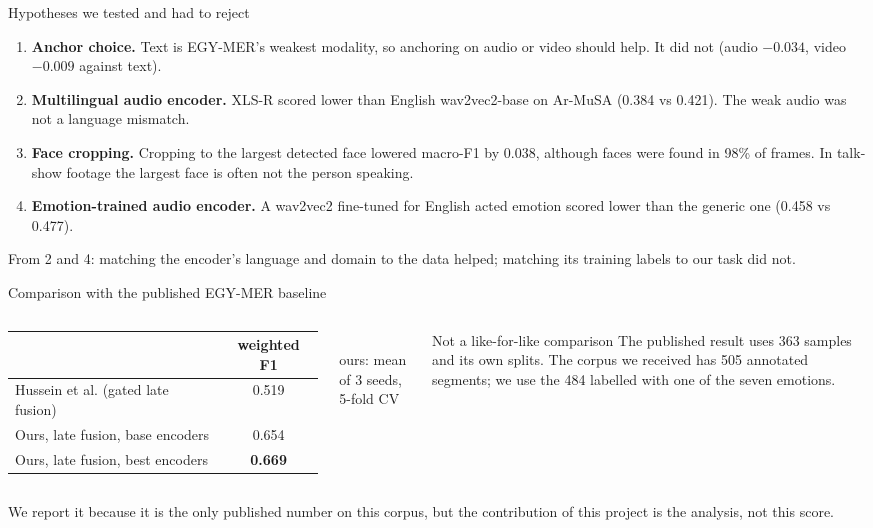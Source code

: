 \documentclass[aspectratio=169,10pt]{beamer}
\newcommand{\muted}[1]{\textcolor{MutedGray}{#1}}
\begin{document}
\begin{frame}[t]{Hypotheses we tested and had to reject}
\begin{enumerate}
\item \textbf{Anchor choice.} Text is EGY-MER's weakest modality, so anchoring on
      audio or video should help. It did not (audio $-0.034$, video $-0.009$ against text).
\item \textbf{Multilingual audio encoder.} XLS-R scored lower than English
      wav2vec2-base on Ar-MuSA (0.384 vs 0.421). The weak audio was not a language mismatch.
\item \textbf{Face cropping.} Cropping to the largest detected face lowered
      macro-F1 by 0.038, although faces were found in 98\% of frames. In talk-show
      footage the largest face is often not the person speaking.
\item \textbf{Emotion-trained audio encoder.} A wav2vec2 fine-tuned for English
      acted emotion scored lower than the generic one (0.458 vs 0.477).
\end{enumerate}
\vspace{0.3cm}
\small From 2 and 4: matching the encoder's language and domain to the data helped;
matching its training labels to our task did not.
\end{frame}

\begin{frame}[t]{Comparison with the published EGY-MER baseline}
\begin{columns}[T,onlytextwidth]
\centering
\begin{tabular}{@{}lc@{}}
\toprule
& weighted F1 \\
\midrule
Hussein et al. (gated late fusion) & 0.519 \\
Ours, late fusion, base encoders & 0.654 \\
Ours, late fusion, best encoders & \textbf{0.669} \\
\bottomrule
\end{tabular}
\\[0.15cm]
{\scriptsize\muted{ours: mean of 3 seeds, 5-fold CV}}
\begin{alertblock}{Not a like-for-like comparison}
The published result uses 363 samples and its own splits.
The corpus we received has 505 annotated segments; we use the 484 labelled with
one of the seven emotions.
\end{alertblock}
\end{columns}
\vspace{0.3cm}
\small We report it because it is the only published number on this corpus, but the
contribution of this project is the analysis, not this score.
\end{frame}
\end{document}
